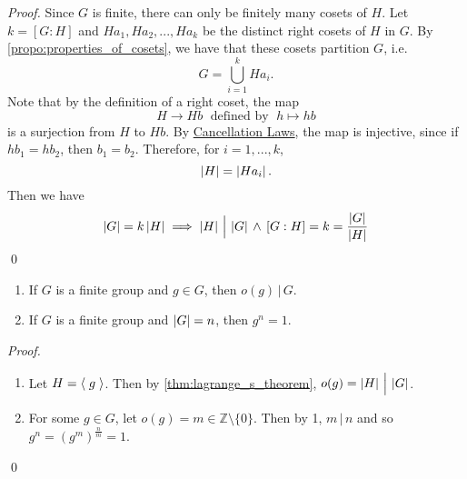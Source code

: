 \documentclass[notoc,notitlepage]{tufte-book}
\begin{document}
\begin{proof}
  Since $G$ is finite, there can only be finitely many cosets of $H$. Let $k = [G : H]$ and $Ha_1, Ha_2, ..., Ha_k$ be the distinct right cosets of $H$ in $G$. By \cref{propo:properties_of_cosets}, we have that these cosets partition $G$, i.e.
  \begin{equation*}
    G = \bigcup_{i = 1}^{k} Ha_i.
  \end{equation*}
  Note that by the definition of a right coset, the map 
  \begin{equation*}
    H \to Hb \; \text{ defined by } \; h \mapsto hb
  \end{equation*}
  is a surjection from $H$ to $Hb$. By \hyperref[propo:cancellation_laws]{Cancellation Laws}, the map is injective, since if $hb_1 = hb_2$, then $b_1 = b_2$. Therefore, for $i = 1, ..., k$,
  \begin{equation*}
    \left|H\right| = \left|Ha_i\right|.
  \end{equation*}
  Then we have
  \begin{equation*}
    \left|G\right| = k \left|H\right| \implies \left|H\right| \, \Big| \, \left|G\right| \, \land \, [G : H] = k = \frac{\left|G\right|}{\left|H\right|}
  \end{equation*}\qed
\end{proof}

\begin{crly}
\label{crly:lagrange_s_theorem_crly1}
  \begin{enumerate}
    \item If $G$ is a finite group and $g \in G$, then $o(g) \, \Big| \, G$.
    \item If $G$ is a finite group and $\left|G\right| = n$, then $g^n = 1$.
  \end{enumerate}
\end{crly}

\begin{proof}
  \begin{enumerate}
    \item Let $H = \langle \; g \; \rangle$. Then by \autoref{thm:lagrange_s_theorem}, $o(g) = \left|H\right| \, \Big| \, \left|G\right|$.

    \item For some $g \in G$, let $o(g) = m \in \mathbb{Z} \setminus \{0\}$. Then by 1, $m \, | \, n$ and so $g^n = (g^m)^{\frac{n}{m}} = 1$.
  \end{enumerate}\qed
\end{proof}
\end{document}
